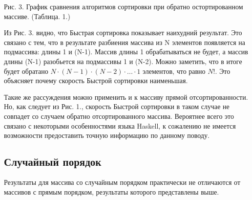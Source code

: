 \documentclass[12pt]{report}
\begin{document}
\begin{center}
	\begin{center}
	\end{center}
	Рис. 3. График сравнения алгоритмов сортировки при обратно остортированном массиве. (Таблица. 1.)
\end{center}

Из Рис. 3. видно, что Быстрая сортировка показывает наихудний результат. Это связано с тем, что в результате разбиения массива из N элементов появляется на подмассива: длины 1 и (N-1). Массив длины 1 обрабатываться не будет, а массив длины (N-1) разобьется на подмассивы 1 и (N-2). Можно заметить, что в итоге будет обратано $N \cdot (N-1) \cdot (N-2) \cdot ... \cdot 1$ элементов, что равно $N!$. Это объясняет почему скорость Быстрой сортировки наименьшая.

Такие же рассуждения можно применить и к массиву прямой отсортированности. Но, как следует из Рис. 1., скорость Быстрой сортировки в таком случае не совпадет со случаем обратно отсортированного массива. Вероятнее всего это связано с некоторыми особенностями языка Haskell, к сожалению не имеется возможности предоставить точную информацию по данному поводу. 

\subsection{Случайный порядок}

Результаты для массива со случайным порядком практически не отличаются от массивов с прямым порядком, результаты которого представлены выше.
\end{document}
